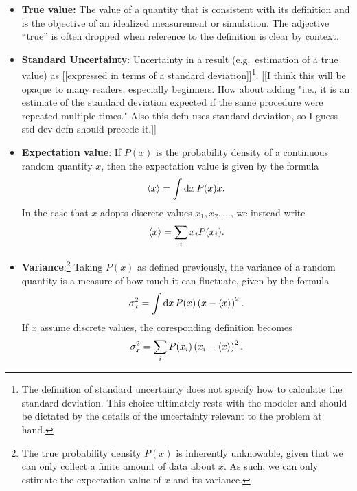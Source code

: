 \begin{itemize}
\item {\bf True value:}  The value of a quantity that is consistent with its definition and is the objective of an idealized measurement or simulation. The adjective ``true'' is often dropped when reference to the definition is clear by context\citep{JCGM:GUM2008,JCGM:VIM2012}.
  \label{def:true_value}




\item {\bf Standard Uncertainty}: Uncertainty in a result (e.g.\ estimation of a true value) as [[expressed in terms of a \hyperref[def:st_dev]{standard deviation}]]\footnote{The definition of standard uncertainty does not specify how to calculate the standard deviation.
    This choice ultimately rests with the modeler and should be dictated by the details of the uncertainty relevant to the problem at hand.}.  {\color{red}[[I think this will be opaque to many readers, especially beginners.  How about adding "i.e., it is an estimate of the standard deviation expected if the same procedure were repeated multiple times."  Also this defn uses standard deviation, so I guess std dev defn should precede it.]]}
  \label{def:std_unc}


\item {\bf Expectation value}:  If $P(x)$ is the probability density of a continuous random quantity $x$, then the expectation value is given by the formula
\begin{align}
  \langle x \rangle = \int {\rm d}x\, P(x) x.
\end{align}
In the case that $x$ adopts discrete values $x_1,x_2,...$, we instead write
\begin{align}
  \langle x \rangle = \sum_i x_i P(x_i).
\end{align}

\item {\bf Variance}:\footnote{The true probability density $P(x)$ is inherently unknowable, given that we can only collect a finite amount of data about $x$.  As such, we can only estimate the expectation value of $x$ and its variance.} Taking $P(x)$ as defined previously, the variance of a random quantity is a measure of how much it can fluctuate, given by the formula
\begin{align}
\sigma_x^2 = \int {\rm d}x\, P(x) \left( x  - \langle x \rangle \right)^2.
\end{align}
If $x$ assume discrete values, the coresponding definition becomes
\begin{align}
\sigma_x^2 = \sum_i P(x_i) \left( x_i  - \langle x \rangle \right)^2.
\end{align}


\end{itemize}

